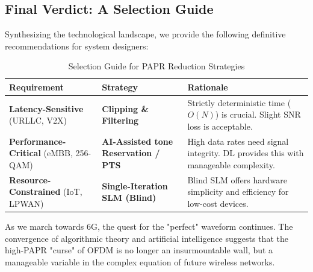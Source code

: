 \documentclass[12pt, a4paper, onecolumn]{article}
\begin{document}
\subsection{Final Verdict: A Selection Guide}
Synthesizing the technological landscape, we provide the following definitive recommendations for system designers:

\begin{table}[htbp]
    \caption{Selection Guide for PAPR Reduction Strategies}
    \begin{center}
        \begin{tabular}{|p{3cm}|p{3cm}|p{4cm}|}
            \hline
            \textbf{Requirement}                          & \textbf{Strategy}                           & \textbf{Rationale}                                                                  \\ \hline
            \textbf{Latency-Sensitive} (URLLC, V2X)       & \textbf{Clipping \& Filtering}              & Strictly deterministic time ($O(N)$) is crucial. Slight SNR loss is acceptable.     \\ \hline
            \textbf{Performance-Critical} (eMBB, 256-QAM) & \textbf{AI-Assisted tone Reservation / PTS} & High data rates need signal integrity. DL provides this with manageable complexity. \\ \hline
            \textbf{Resource-Constrained} (IoT, LPWAN)    & \textbf{Single-Iteration SLM (Blind)}       & Blind SLM offers hardware simplicity and efficiency for low-cost devices.           \\ \hline
        \end{tabular}
        \label{tab3}
    \end{center}
\end{table}

As we march towards 6G, the quest for the "perfect" waveform continues. The convergence of algorithmic theory and artificial intelligence suggests that the high-PAPR "curse" of OFDM is no longer an insurmountable wall, but a manageable variable in the complex equation of future wireless networks.
\end{document}

